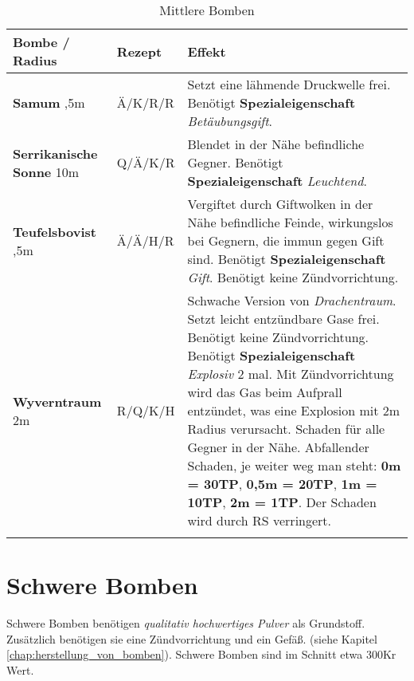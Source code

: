 \begin{longtable}{|p{4cm}|p{}|p{9cm}|}
\hline
\textbf{Bombe} / Radius & \textbf{Rezept} & \textbf{Effekt} \\ \hline

\textbf{Samum} \newline 2,5m & Ä/K/R/R & Setzt eine lähmende Druckwelle frei. Benötigt \textbf{Spezialeigenschaft} \textit{Betäubungsgift}. \\ \hline

\textbf{Serrikanische Sonne} \newline 10m & Q/Ä/K/R & Blendet in der Nähe befindliche Gegner. Benötigt \textbf{Spezialeigenschaft} \textit{Leuchtend}. \\ \hline

\textbf{Teufelsbovist} \newline 2,5m & Ä/Ä/H/R & Vergiftet durch Giftwolken in der Nähe befindliche Feinde, wirkungslos bei Gegnern, die immun gegen Gift sind. Benötigt \textbf{Spezialeigenschaft} \textit{Gift}. Benötigt keine Zündvorrichtung. \\ \hline

\textbf{Wyverntraum} \newline 2m & R/Q/K/H & Schwache Version von \textit{Drachentraum}. Setzt leicht entzündbare Gase frei. Benötigt keine Zündvorrichtung. Benötigt \textbf{Spezialeigenschaft} \textit{Explosiv} 2 mal. Mit Zündvorrichtung wird das Gas beim Aufprall entzündet, was eine Explosion mit 2m Radius verursacht. Schaden für alle Gegner in der Nähe. Abfallender Schaden, je weiter weg man steht: \textbf{0m = 30TP}, \textbf{0,5m = 20TP}, \textbf{1m = 10TP}, \textbf{2m = 1TP}. Der Schaden wird durch RS verringert. \\ \hline

\caption{Mittlere Bomben}
\label{tab:mittlere_bomben}
\end{longtable}


\section{Schwere Bomben}
Schwere Bomben benötigen \textit{qualitativ hochwertiges Pulver} als Grundstoff. Zusätzlich benötigen sie eine Zündvorrichtung und ein Gefäß. (siehe Kapitel \ref{chap:herstellung_von_bomben}). Schwere Bomben sind im Schnitt etwa 300Kr Wert.

